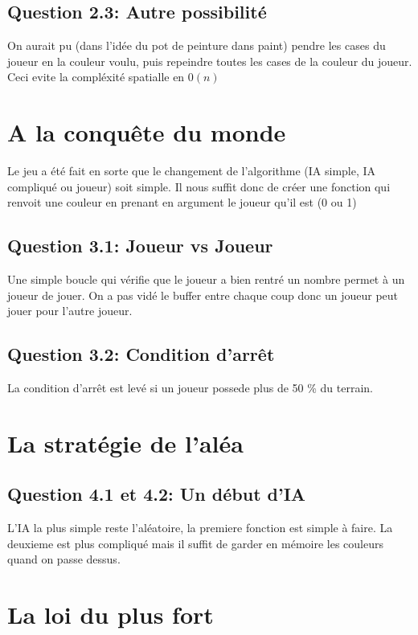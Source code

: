 \documentclass[11pt]{article}
\begin{document}
    \subsection{Question 2.3: Autre possibilité}
    On aurait pu (dans l'idée du pot de peinture dans paint) pendre les cases du joueur en la couleur voulu, puis repeindre toutes les cases de la couleur du joueur. Ceci evite la compléxité spatialle en $\mathcal{0}(n)$

    \section{A la conquête du monde}

    Le jeu a été fait en sorte que le changement de l'algorithme (IA simple, IA compliqué ou joueur) soit simple. Il nous suffit donc de créer une fonction qui renvoit une couleur en prenant en argument le joueur qu'il est (0 ou 1)

    \subsection{Question 3.1: Joueur vs Joueur}

    Une simple boucle qui vérifie que le joueur a bien rentré un nombre permet à un joueur de jouer. On a pas vidé le buffer entre chaque coup donc un joueur peut jouer pour l'autre joueur.

    \subsection{Question 3.2: Condition d'arrêt}

    La condition d'arrêt est levé si un joueur possede plus de 50 \% du terrain.

    \section{La stratégie de l'aléa}

    \subsection{Question 4.1 et 4.2: Un début d'IA}

    L'IA la plus simple reste l'aléatoire, la premiere fonction est simple à faire. La deuxieme est plus compliqué mais il suffit de garder en mémoire les couleurs quand on passe dessus.

    \section{La loi du plus fort}
\end{document}
